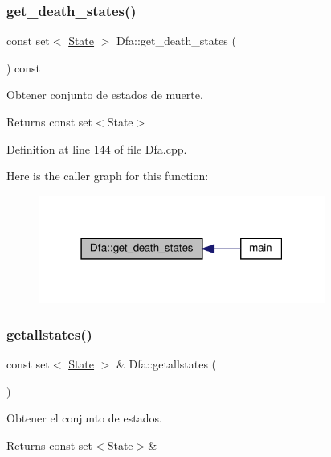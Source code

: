 \subsubsection{\texorpdfstring{get\+\_\+death\+\_\+states()}{get\_death\_states()}}
{\footnotesize\ttfamily const set$<$ \hyperlink{class_state}{State} $>$ Dfa\+::get\+\_\+death\+\_\+states (\begin{DoxyParamCaption}{ }\end{DoxyParamCaption}) const}



Obtener conjunto de estados de muerte. 

\begin{DoxyReturn}{Returns}
const set$<$\+State$>$ 
\end{DoxyReturn}


Definition at line 144 of file Dfa.\+cpp.

Here is the caller graph for this function\+:
\nopagebreak
\begin{figure}[H]
\begin{center}
\leavevmode
\includegraphics[width=267pt]{class_dfa_a5e6cfb28034248d381e2fedb0df3d377_icgraph}
\end{center}
\end{figure}
\mbox{\label{class_dfa_a5f6b650f05ec3b8a5aa862c0f513c19e}} 
\subsubsection{\texorpdfstring{getallstates()}{getallstates()}}
{\footnotesize\ttfamily const set$<$ \hyperlink{class_state}{State} $>$ \& Dfa\+::getallstates (\begin{DoxyParamCaption}{ }\end{DoxyParamCaption})}



Obtener el conjunto de estados. 

\begin{DoxyReturn}{Returns}
const set$<$\+State$>$\& 
\end{DoxyReturn}


